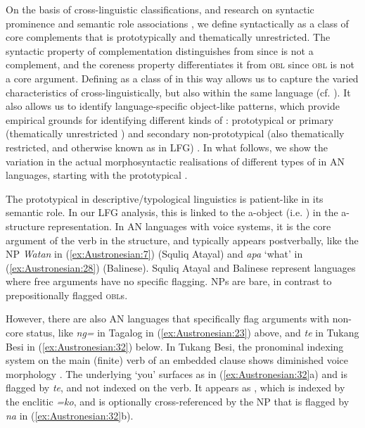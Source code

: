 \documentclass[output=paper,chinesefont]{../langscibook}
\begin{document}
On the basis of cross-linguistic \GF classifications, and research on syntactic prominence and semantic role associations \citep{Comrie1989,bresnan2001lexical}, we define \OBJ syntactically as a class of core complements that is prototypically and thematically unrestricted. The syntactic property of complementation dis\-tin\-gui\-shes \OBJ from \SUBJ since \SUBJ is not a complement, and the coreness property differentiates it from \textsc{obl} since \textsc{obl} is not a core argument. Defining \OBJ as a class of \GF in this way allows us to capture the varied characteristics of \OBJ cross-linguistically, but also within the same language (cf. \citealt{DN}). It also allows us to identify language-specific object-like patterns, which provide empirical grounds for identifying different kinds of \OBJ: prototypical or primary \OBJ (thematically unrestricted \OBJ) and secondary non-prototypical \OBJ (also thematically restricted, and otherwise known as \OBJTHETA in LFG) \citep{bresnan1989locative,Haspelmath2007}. In what follows, we show the variation in the actual morphosyntactic realisations of different types of \OBJ in AN languages, starting with the prototypical \OBJ.

The prototypical \OBJ in descriptive/typological linguistics is patient-like in its semantic role. In our LFG analysis, this \OBJ is linked to the a-object (i.e. ) in the a-structure representation. In AN languages with voice systems, it is the core argument of the verb in the \AV structure, and typically appears postverbally, like the NP \emph{Watan} in (\ref{ex:Austronesian:7}) (Squliq Atayal) and \emph{apa} `what' in (\ref{ex:Austronesian:28}) (Balinese). Squliq Atayal and Balinese represent languages where free \OBJ arguments have no specific \OBJ flagging. \OBJ NPs are bare, in contrast to prepositionally flagged \textsc{obl}s.

However, there are also AN languages that specifically flag  arguments with non-\SUBJ core status, like \emph{ng=} in Tagalog in (\ref{ex:Austronesian:23}) above, and \emph{te} in Tukang Besi in (\ref{ex:Austronesian:32}) below. In Tukang Besi, the pronominal indexing system on the main (finite) verb of an embedded clause shows diminished voice morphology \citep[8]{Donohue2008}. The underlying  `you' surfaces as \OBJ in (\ref{ex:Austronesian:32}a) and is flagged by \emph{te}, and not indexed on the verb. It appears as \SUBJ, which is indexed by the enclitic \emph{=ko}, and is optionally cross-referenced by the \NOM NP that is flagged by \emph{na} in (\ref{ex:Austronesian:32}b).
\end{document}
